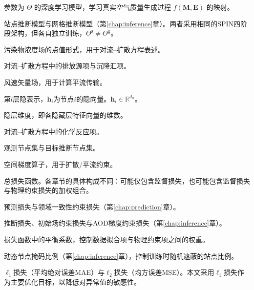 \begin{denotation}[3cm]
\item[\(\mathcal{F}_\Theta\)] 参数为 \(\Theta\) 的深度学习模型，学习真实空气质量生成过程 \(f(\mathbf{M}, \mathbf{E})\) 的映射。
\item[\(\mathcal{F}^{\text{s}}_{\Theta^{\text{s}}}, \mathcal{F}^{\text{g}}_{\Theta^{\text{g}}}\)] 站点推断模型与网格推断模型（第\ref{chap:inference}章）。两者采用相同的SPIN四阶段架构，但各自独立训练，$\Theta^{\text{s}} \neq \Theta^{\text{g}}$。
\item[\(C\)] 污染物浓度场的点值形式，用于对流--扩散方程表述。
\item[\(S, D\)] 对流--扩散方程中的排放源项与沉降汇项。
\item[\(\mathbf{u}\)] 风速矢量场，用于计算平流传输。
\item[\(\mathbf{H}^{(l)}, \mathbf{h}_i\)] 第$l$层隐表示，$\mathbf{h}_i$为节点$i$的隐向量。$\mathbf{h}_i \in \mathbb{R}^{d_h}$。
\item[\(d_h\)] 隐层维度，即各隐藏层特征向量的维数。
\item[\(R\)] 对流--扩散方程中的化学反应项。
\item[\(\mathcal{V}_{\text{obs}}, \mathcal{V}_{\text{target}}\)] 观测节点集与目标推断节点集。
\item[\(\nabla\)] 空间梯度算子，用于扩散/平流约束。
\item[\(\mathcal{L}\)] 总损失函数。各章节的具体构成不同：可能仅包含监督损失，也可能包含监督损失与物理约束损失的加权组合。
\item[\(\mathcal{L}_{\mathrm{Pred}}, \mathcal{L}_{\mathrm{DIC}}\)] 预测损失与领域一致性约束损失（第\ref{chap:prediction}章）。
\item[\(\mathcal{L}_{\mathrm{infer}}, \mathcal{L}_{\mathrm{init}}, \mathcal{L}_{\mathrm{AOD}}\)] 推断损失、初始场约束损失与AOD梯度约束损失（第\ref{chap:inference}章）。
\item[\(\lambda, \lambda_1, \lambda_2\)] 损失函数中的平衡系数，控制数据拟合项与物理约束项之间的权重。
\item[\(r_{\text{mask}}\)] 动态节点掩码比例（第\ref{chap:inference}章），控制训练时随机遮蔽的站点比例。
\item[\(\ell_1, \ell_2\)] $\ell_1$损失（平均绝对误差MAE）与$\ell_2$损失（均方误差MSE）。本文采用$\ell_1$损失作为主要优化目标，以降低对异常值的敏感性。


\end{denotation}
